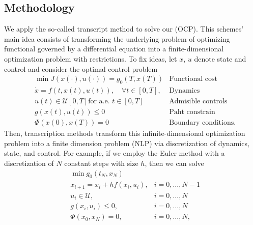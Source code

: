\subsection{Methodology}
        We apply the so-called transcript method to solve our (OCP).
    This schemes' main idea consists of transforming the underlying problem of
    optimizing functional governed by a differential equation into a
    finite-dimensional optimization problem with restrictions. To fix ideas,
    let $x$, $u$ denote state and control and consider the optimal
    control problem
    \begin{equation*}
        \begin{aligned}
                & \min J(x(\cdot), u(\cdot)) = g_0(T, x(T))
                & \text{Functional cost}
            \\
                & \dot{x} = f(t, x(t), u(t)),
                \quad\forall t \in [0, T],
                & \text{Dynamics}
            \\
                & u(t) \in \mathcal{U}[0, T] \text{for a.e. } t\in [0, T]
                & \text{Admisible controls}
            \\
                & g(x(t), u(t)) \leq 0
                & \text{Paht constrain}
            \\
                & \Phi(x(0), x(T)) = 0
                & \text{Boundary conditions}.
        \end{aligned}
    \end{equation*}
        Then, transcription methods transform this infinite-dimensional
    optimization problem into a finite dimension problem (NLP) via
    discretization of dynamics, state, and control.  For example, if we
    employ the Euler method with a discretization of $N$ constant steps with
    size $h$, then we can solve
        \begin{equation}
            \label{eqn:nlp}
            \begin{aligned}
                    &\min g_0(t_N, x_N)
                \\
                    &
                        x_{i+1} = x_i + h f(x_i, u_i),
                    & i = 0, \dots, N - 1
                \\
                    &
                        u_i \in \mathcal{U},
                    & i = 0, \dots, N
                \\
                    &
                        g(x_i, u_i) \leq 0,
                    & i = 0, \dots, N
                \\
                    &
                    \Phi(x_0, x_N) = 0,
                    &i = 0, \dots, N,
            \end{aligned}
        \end{equation}

